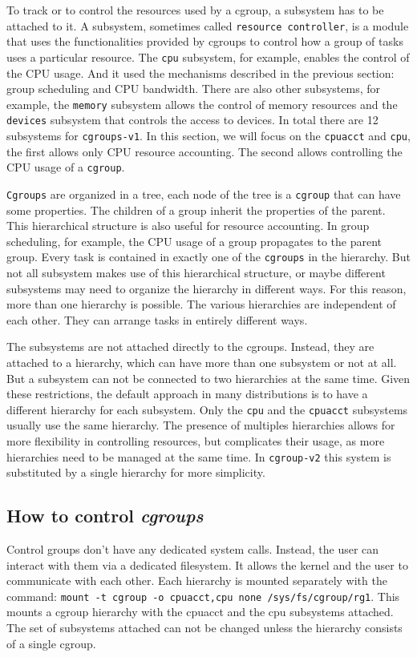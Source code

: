 To track or to control the resources used by a cgroup, a subsystem has to be attached to it. A subsystem, sometimes called \verb|resource controller|, is a module that uses the functionalities provided by cgroups to control how a group of tasks uses a particular resource. The \verb|cpu| subsystem, for example, enables the control of the CPU usage. And it used the mechanisms described in the previous section: group scheduling and CPU bandwidth. There are also other subsystems, for example, the \verb|memory| subsystem allows the control of memory resources and the \verb|devices| subsystem that controls the access to devices. In total there are 12 subsystems for \verb|cgroups-v1|. In this section, we will focus on the \verb|cpuacct| and \verb|cpu|, the first allows only CPU resource accounting. The second allows controlling the CPU usage of a \verb|cgroup|.

\verb|Cgroups| are organized in a tree, each node of the tree is a \verb|cgroup| that can have some properties. The children of a group inherit the properties of the parent. This hierarchical structure is also useful for resource accounting. In group scheduling, for example, the CPU usage of a group propagates to the parent group. Every task is contained in exactly one of the \verb|cgroups| in the hierarchy. But not all subsystem makes use of this hierarchical structure, or maybe different subsystems may need to organize the hierarchy in different ways. For this reason, more than one hierarchy is possible. The various hierarchies are independent of each other. They can arrange tasks in entirely different ways.

The subsystems are not attached directly to the cgroups. Instead, they are attached to a hierarchy, which can have more than one subsystem or not at all. But a subsystem can not be connected to two hierarchies at the same time. Given these restrictions, the default approach in many distributions is to have a different hierarchy for each subsystem. Only the \verb|cpu| and the \verb|cpuacct| subsystems usually use the same hierarchy. The presence of multiples hierarchies allows for more flexibility in controlling resources, but complicates their usage, as more hierarchies need to be managed at the same time. In \verb|cgroup-v2| this system is substituted by a single hierarchy for more simplicity.

\subsection{How to control \textit{cgroups}}
Control groups don't have any dedicated system calls. Instead, the user can interact with them via a dedicated filesystem. It allows the kernel and the user to communicate with each other. Each hierarchy is mounted separately with the command: \verb|mount -t cgroup -o cpuacct,cpu none /sys/fs/cgroup/rg1|. \newline This mounts a cgroup hierarchy with the cpuacct and the cpu subsystems attached. The set of subsystems attached can not be changed unless the hierarchy consists of a single cgroup.


